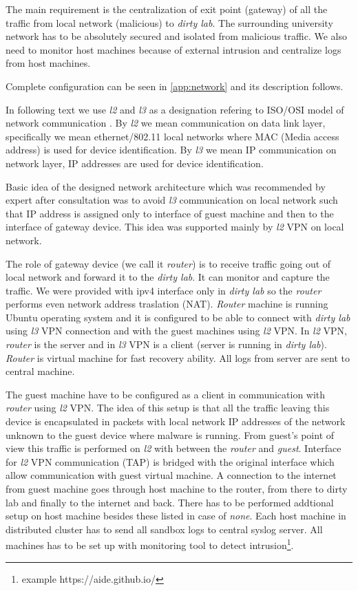The main requirement is the centralization of exit point (gateway) of all the traffic from local network (malicious) to \emph{dirty lab}. The surrounding university network has to be absolutely secured and isolated from malicious traffic. We also need to monitor host machines because of external intrusion and centralize logs from host machines.

Complete configuration can be seen in \ref{app:network} and its description follows.

In following text we use \emph{l2} and \emph{l3} as a designation refering to ISO/OSI model of network communication \cite{Zimmermann1980}. By \emph{l2} we mean communication on data link layer, specifically we mean ethernet/802.11 local networks where MAC (Media access address) is used for device identification. By \emph{l3} we mean IP communication on network layer, IP addresses are used for device identification.

Basic idea of the designed network architecture which was recommended by expert after consultation was to avoid \emph{l3} communication on local network such that IP address is assigned only to interface of guest machine and then to the interface of gateway device. This idea was supported mainly by \emph{l2} VPN on local network.

The role of gateway device (we call it \emph{router}) is to receive traffic going out of local network and forward it to the \emph{dirty lab}. It can monitor and capture the traffic. We were provided with ipv4 interface only in \emph{dirty lab} so the \emph{router} performs even network address traslation (NAT). \emph{Router} machine is running Ubuntu operating system and it is configured to be able to connect with \emph{dirty lab} using \emph{l3} VPN connection and with the guest machines using \emph{l2} VPN. In \emph{l2} VPN, \emph{router} is the server and in \emph{l3} VPN is a client (server is running in \emph{dirty lab}). \emph{Router} is virtual machine for fast recovery ability. All logs from server are sent to central machine.

The guest machine have to be configured as a client in communication with \emph{router} using \emph{l2} VPN. The idea of this setup is that all the traffic leaving this device is encapsulated in packets with local network IP addresses of the network unknown to the guest device where malware is running. From guest's point of view this traffic is performed on \emph{l2} with between the \emph{router} and \emph{guest}. Interface for \emph{l2} VPN communication (TAP) is bridged with the original interface which allow communication with guest virtual machine. A connection to the internet from guest machine goes through host machine to the router, from there to dirty lab and finally to the internet and back. There has to be performed addtional setup on host machine besides these listed in case of \emph{none}. Each host machine in distributed cluster has to send all sandbox logs to central syslog server. All machines has to be set up with monitoring tool to detect intrusion\footnote{example https://aide.github.io/}.


